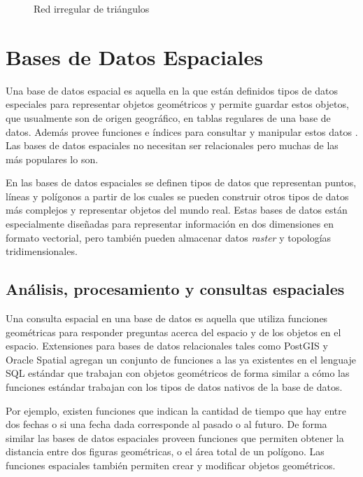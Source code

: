 \begin{figure}[h]
	\centering
	
	\caption{Red irregular de triángulos}
	\label{fig:modelo-tin} 
\end{figure}

\section{Bases de Datos Espaciales}

Una base de datos espacial es aquella en la que están definidos tipos de datos especiales para representar objetos geométricos y permite guardar estos objetos, que usualmente son de origen geográfico, en tablas regulares de una base de datos. Además provee funciones e índices para consultar y manipular estos datos \citep{obe2011postgis}. Las bases de datos espaciales no necesitan ser relacionales pero muchas de las más populares lo son.

En las bases de datos espaciales se definen tipos de datos que representan puntos, líneas y polígonos a partir de los cuales se pueden construir otros tipos de datos más complejos y representar objetos del mundo real. Estas bases de datos están especialmente diseñadas para representar información en dos dimensiones en formato vectorial, pero también pueden almacenar datos \emph{raster} y topologías tridimensionales.

\subsection{Análisis, procesamiento y consultas espaciales}


Una consulta espacial en una base de datos es aquella que utiliza funciones geométricas para responder preguntas acerca del espacio y de los objetos en el espacio. Extensiones para bases de datos relacionales tales como PostGIS y Oracle Spatial agregan un conjunto de funciones a las ya existentes en el lenguaje SQL estándar que trabajan con objetos geométricos de forma similar a cómo las funciones estándar trabajan con los tipos de datos nativos de la base de datos.

Por ejemplo, existen funciones que indican la cantidad de tiempo que hay entre dos fechas o si una fecha dada corresponde al pasado o al futuro. De forma similar las bases de datos espaciales proveen funciones que permiten obtener la distancia entre dos figuras geométricas, o el área total de un polígono. Las funciones espaciales también permiten crear y modificar objetos geométricos.

